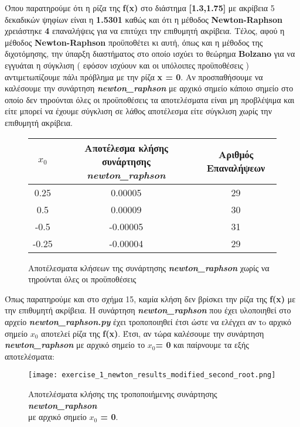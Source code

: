 \documentclass[First Project.tex]{subfiles}
\begin{document}
Όπου παρατηρούμε ότι η ρίζα της \textlatin{\textbf{f(x)}} στο διάστημα \textlatin{\textbf{[1.3,1.75]}} με ακρίβεια 5 δεκαδικών ψηφίων 
είναι η \textbf{1.5301} καθώς και ότι η μέθοδος \textlatin{\textbf{Newton-Raphson}} χρειάστηκε \textbf{4} επαναλήψεις για να επιτύχει την 
επιθυμητή ακρίβεια. Τέλος, αφού η μέθοδος \textlatin{\textbf{Newton-Raphson}} προϋποθέτει κι αυτή, όπως και η μέθοδος της διχοτόμησης, την 
ύπαρξη διαστήματος στο οποίο ισχύει το θεώρημα \textlatin{\textbf{Bolzano}} για να εγγυάται η σύγκλιση ( εφόσον ισχύουν και οι υπόλοιπες 
προϋποθέσεις ) αντιμετωπίζουμε πάλι πρόβλημα με την ρίζα \textbf{\textlatin{x = 0}}. Αν προσπαθήσουμε να καλέσουμε την συνάρτηση
\textit{\textlatin{\textbf{newton\_raphson}}} με αρχικό σημείο κάποιο σημείο στο οποίο δεν τηρούνται όλες οι προϋποθέσεις τα αποτελέσματα
είναι μη προβλέψιμα και είτε μπορεί να έχουμε σύγκλιση σε λάθος αποτέλεσμα είτε σύγκλιση χωρίς την επιθυμητή ακρίβεια.
\begin{figure}[h!]
    \centering
    \captionsetup{justification=centering}
    \begin{center}
        \begin{tabular}{ |c|c|c| }       
            \hline
            \textbf{\textlatin{$x_{0}$}} & Αποτέλεσμα κλήσης συνάρτησης \textit{\textlatin{\textbf{newton\_raphson}}} & Αριθμός Επαναλήψεων \\
            \hline
            0.25 & 0.00005 & 29 \\ \hline
            0.5 & 0.00009 & 30 \\ \hline
            -0.5 & -0.00005 & 31 \\ \hline
            -0.25 & -0.00004 & 29 \\ [1ex]
            \hline
        \end{tabular}
        \caption{ Αποτέλεσματα κλήσεων της συνάρτησης \textit{\textlatin{\textbf{newton\_raphson}}} χωρίς να τηρούνται όλες οι προϋποθέσεις}
    \end{center}
\end{figure}

Όπως παρατηρούμε και στο σχήμα 15, καμία κλήση δεν βρίσκει την ρίζα της \textlatin{\textbf{f(x)}} με την επιθυμητή ακρίβεια. Η συνάρτηση 
\textit{\textlatin{\textbf{newton\_raphson}}} που έχει υλοποιηθεί στο αρχείο \textit{\textlatin{\textbf{newton\_raphson.py}}} έχει τροποποιηθεί 
έτσι ώστε να ελέγχει αν τo αρχικό σημείο \textbf{\textlatin{$x_{0}$}} αποτελεί ρίζα της \textlatin{\textbf{f(x)}}. Έτσι, αν τώρα
καλέσουμε την συνάρτηση \textit{\textlatin{\textbf{newton\_raphson}}} με αρχικό σημείο το \textlatin{\textbf{$x_{0}$= 0}} και παίρνουμε τα 
εξής αποτελέσματα:
\vspace{5mm}
\begin{figure}[h!]
    \centering
    \captionsetup{justification=centering}
    \begin{center}
    \texttt{[image: exercise\_1\_newton\_results\_modified\_second\_root.png]}    
    \caption{ Αποτελέσματα κλήσης της τροποποιήμενης συνάρτησης \textit{\textlatin{\textbf{newton\_raphson}}} \\ με αρχικό σημείο \textbf{\textlatin{$x_{0}$ = 0}}. }
    \end{center}
\end{figure}


\newpage

    
\end{document}
